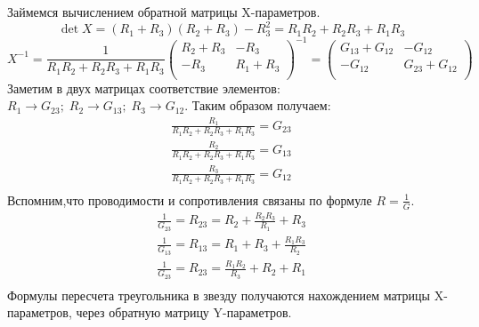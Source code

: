 \documentclass[11pt,a4paper]{article}
\begin{document}
Займемся вычислением обратной матрицы X-параметров.
$$
\det X = (R_1 + R_3)(R_2+R_3) - R_3^2 = R_1R_2 + R_2R_3+R_1R_3
$$
$$
X^{-1} = \frac{1}{R_1R_2 + R_2R_3+R_1R_3}
\begin{pmatrix}
R_2 + R_3 & -R_3 \\ -R_3 & R_1 + R_3\\
\end{pmatrix}^{-1}
=
\begin{pmatrix}
G_{13} + G_{12} & -G_{12} \\ -G_{12} & G_{23}+G_{12}\\
\end{pmatrix}
$$
Заметим в двух матрицах соответствие элементов: $R_1 \rightarrow G_{23};\; R_2 \rightarrow 
G_{13};\; R_3 \rightarrow G_{12}$.
Таким образом получаем:
$$
\begin{array}{l}
\frac{R_1}{R_1R_2 + R_2R_3+R_1R_3} = G_{23} \\
\frac{R_2}{R_1R_2 + R_2R_3+R_1R_3} = G_{13} \\
\frac{R_3}{R_1R_2 + R_2R_3+R_1R_3} = G_{12} \\
\end{array}
$$
Вспомним,что проводимости и сопротивления связаны по формуле $R = \frac{1}{G}$.
$$
\begin{array}{l}
\frac{1}{G_{23}} = R_{23} = R_2 + \frac{R_2R_3}{R_1} + R_3 \\
\frac{1}{G_{13}} = R_{13} = R_1 + R_3 + \frac{R_1R_3}{R_2} \\
\frac{1}{G_{23}} = R_{23} = \frac{R_1R_2}{R_3} + R_2 + R_1 \\
\end{array}
$$
Формулы пересчета треугольника в звезду получаются нахождением матрицы X-параметров, через обратную 
матрицу Y-параметров.
\end{document}
